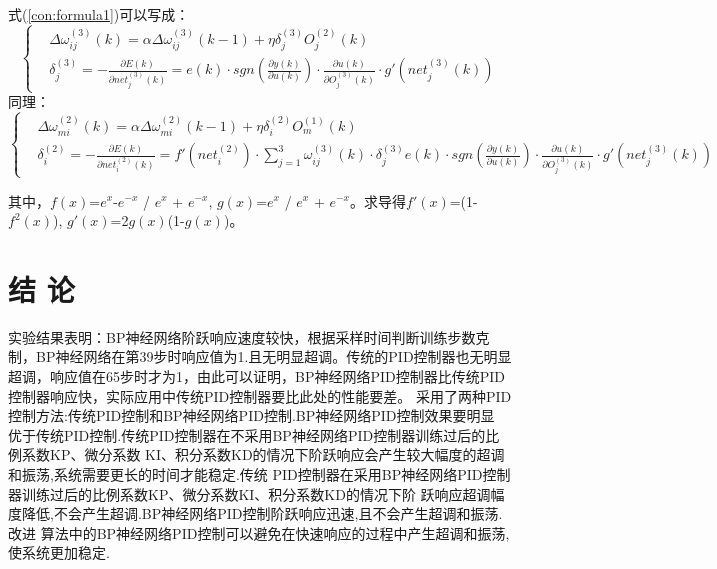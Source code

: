\documentclass[UTF8,a4paper,10pt,nocolorlinks]{ctexart}
\begin{document}
    式(\ref{con:formula1})可以写成：
    \begin{equation}
        \begin{cases}
        & \Delta\omega_{ij}^{(3)}(k)=\alpha\Delta\omega_{ij}^{(3)}(k-1) + \eta\delta_{j}^{(3)}O_{j}^{(2)}(k) \\
        & \delta_{j}^{(3)} = -\frac{\partial E(k)}{\partial net_{j}^{(3)}(k)} = e(k) \cdot{sgn(\frac{\partial y(k)}{\partial u(k)})} \cdot{\frac{\partial u(k)}{\partial O_{j}^{(3)}(k)}} \cdot{g'(net_{j}^{(3)}(k))}
        \end{cases}
    \end{equation}
    同理：
    \begin{equation}
        \begin{cases}
        & \Delta\omega_{mi}^{(2)}(k)=\alpha\Delta\omega_{mi}^{(2)}(k-1) + \eta\delta_{i}^{(2)}O_{m}^{(1)}(k) \\
        & \delta_{i}^{(2)} = -\frac{\partial E(k)}{\partial net_{i}^{(2)}(k)} =f'(net_{i}^{(2)}) \cdot{\sum\limits_{j=1}^{3}\omega_{ij}^{(3)}(k)} \cdot{\delta_{j}^{(3)}}             e(k) \cdot{sgn(\frac{\partial y(k)}{\partial u(k)})} \cdot{\frac{\partial u(k)}{\partial O_{j}^{(3)}(k)}} \cdot{g'(net_{j}^{(3)}(k))}
        \end{cases}
    \end{equation}
    \par 其中，$f(x)$=$e^{x}$-$e^{-x}$ / $e^{x}$ + $e^{-x}$, $g(x)$=$e^{x}$ / $e^{x}$ + $e^{-x}$。求导得$f'(x)$=(1-$f^{2}(x)$), $g'(x)$=2$g(x)$(1-$g(x)$)。
    \clearpage %
    \section{结 论}
    实验结果表明：BP神经网络阶跃响应速度较快，根据采样时间判断训练步数克制，BP神经网络在第39步时响应值为1.且无明显超调。传统的PID控制器也无明显超调，响应值在65步时才为1，由此可以证明，BP神经网络PID控制器比传统PID控制器响应快，实际应用中传统PID控制器要比此处的性能要差。
    采用了两种PID控制方法:传统PID控制和BP神经网络PID控制.BP神经网络PID控制效果要明显
优于传统PID控制.传统PID控制器在不采用BP神经网络PID控制器训练过后的比例系数KP、微分系数
KI、积分系数KD的情况下阶跃响应会产生较大幅度的超调和振荡,系统需要更长的时间才能稳定.传统
PID控制器在采用BP神经网络PID控制器训练过后的比例系数KP、微分系数KI、积分系数KD的情况下阶
跃响应超调幅度降低,不会产生超调.BP神经网络PID控制阶跃响应迅速,且不会产生超调和振荡.改进
算法中的BP神经网络PID控制可以避免在快速响应的过程中产生超调和振荡,使系统更加稳定.
    \clearpage %
    
\end{document}
